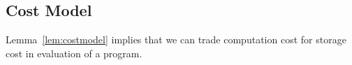 \subsection{Cost Model}
Lemma~\ref{lem:costmodel} implies that we can trade computation cost for
storage cost in evaluation of a \slang program. 






